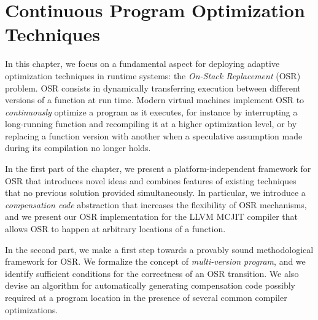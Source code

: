 \chapter{Continuous Program Optimization Techniques}
\label{ch:continuous}

In this chapter, we focus on a fundamental aspect for deploying adaptive optimization techniques in runtime systems: the {\em On-Stack Replacement} (OSR) problem. OSR consists in dynamically transferring execution between different versions of a function at run time. Modern virtual machines implement OSR to {\em continuously} optimize a program as it executes, for instance by interrupting a long-running function and recompiling it at a higher optimization level, or by replacing a function version with another when a speculative assumption made during its compilation no longer holds.

In the first part of the chapter, we present a platform-independent framework for OSR that introduces novel ideas and combines features of existing techniques that no previous solution provided simultaneously. In particular, we introduce a {\em compensation code} abstraction that increases the flexibility of OSR mechanisms, and we present our OSR implementation for the LLVM MCJIT compiler that allows OSR to happen at arbitrary locations of a function.

In the second part, we make a first step towards a provably sound methodological framework for OSR. We formalize the concept of {\em multi-version program}, and we identify sufficient conditions for the correctness of an OSR transition. We also devise an algorithm for automatically generating compensation code possibly required at a program location in the presence of several common compiler optimizations.


